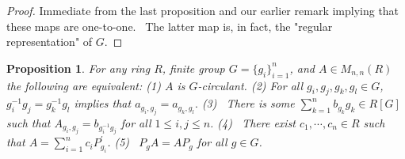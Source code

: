 \documentclass[12pt, a4paper]{amsart}
\numberwithin{equation}{section} %
\theoremstyle{plain}
\theoremstyle{definition}
\theoremstyle{plain}
\newtheorem{prop}[thm]{Proposition}
\theoremstyle{remark}
\begin{document}
\begin{proof}
{}Immediate from the last proposition and our earlier remark implying that
these maps are one-to-one. \ The latter map is, in fact, the "regular
representation" of $G$.
\end{proof}

\begin{prop}
For any ring $R$, finite group $G=\{g_{i}\}_{i=1}^{n}$, and $A\in M_{n,n}(R)$
the following are equivalent:\newline
(1) $A$ is $G$-circulant.\newline
(2)  For all $g_i,g_j,g_k,g_l \in G$,  $g_{i}^{-1}g_{j}=g_{k}^{-1}g_{l}$ implies
that $a_{g_{i},g_{j}}=a_{g_{k},g_{l}}.$
\newline
(3) \ There is some $\sum\limits_{k=1}^{n}b_{g_{k}}g_{k}\in R[G]$ such that 
$A_{g_{i},g_{j}}=b_{g_{i}^{-1}g_{j}}$ for all $1\leq i,j\leq n$.\newline
(4) \ There exist $c_{1},\cdots ,c_{n}\in R$ such that $A=\sum%
\limits_{i=1}^{n}c_{i}P_{g_{i}}^{\prime }$.\newline
(5) \ $P_{g}A=AP_{g}$ for all $g\in G$.
\end{prop}
\end{document}

